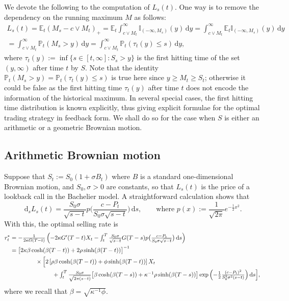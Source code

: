 \documentclass[openany,oneside]{article}
\theoremstyle{definition}
\theoremstyle{remark}
\newtheorem{rem}[thm]{Remark}
\newcommand{\E}{\mathbb{E}} %
\renewcommand{\P}{\mathbb{P}} %
\newcommand{\I}{\mathbb{I}} %
\newcommand{\ts}{\textstyle}
\newcommand{\de}{\,\mathrm{d}}
\begin{document}

We devote the following to the computation of $L_s(t)$. One way is to remove the dependency on the running maximum $M$ as follows:
\begin{multline*}
\ts L_s(t) = \E_t(M_s-c\vee M_t)_+ = \E_t \int_{c\vee M_t}^{\infty}\I_{(-\infty,M_s)}(y) \de y = \int_{c\vee M_t}^\infty \E_t \I_{(-\infty,M_s)}(y)\de y \\
 \ts = \int_{c\vee M_t}^\infty \P_t(M_s > y) \de y= \int_{c\vee M_t}^\infty \P_t(\tau_t(y) \le s) \de y,
\end{multline*}
where $\tau_t(y):=\inf\{s\in[t,\infty] : S_s> y\}$ is the first hitting time of the set $(y,\infty)$ after time $t$ by $S$. Note that the identity $\P_t(M_s > y) = \P_t(\tau_t(y)\le s)$ is true here since $y\ge M_t\ge S_t$; otherwise it could be false as the first hitting time $\tau_t(y)$ after time $t$ does not encode the information of the historical maximum. In several special cases, the first hitting time distribution is known explicitly, thus giving explicit formulae for the optimal trading strategy in feedback form. We shall do so for the case when $S$ is either an arithmetic or a geometric Brownian motion.

\subsection{Arithmetic Brownian motion}
Suppose that $S_t:=S_0(1+ \sigma B_t)$ where $B$ is a standard one-dimensional Brownian motion, and $S_0, \sigma>0$ are constants, so that $L_s(t)$ is the price of a lookback call in the Bachelier model. A straightforward calculation shows that
\[
 \ts \de_s L_s(t) = \frac{S_0\sigma}{\sqrt{s-t}}p\bigl(\frac{c-P_t}{S_0\sigma\sqrt{s-t}}\bigr)\de s,\qquad\text{where } p(x):=\frac{1}{\sqrt{2\pi}}e^{-\frac{1}{2}x^2}.
\]
With this, the optimal selling rate is
\begin{align*}
r^\ast_t &\ts= -\frac{1}{2\kappa G(T-t)}\left(-2\kappa G'(T-t) X_t - \int_t^T \frac{S_0\sigma}{\sqrt{s-t}} G(T-s) p\bigl(\frac{c-P_t}{S_0\sigma\sqrt{s-t}}\bigr) \de s\right) \\
&= \bigl[2\kappa\beta\cosh(\beta (T-t))+2\rho\sinh(\beta (T-t))\bigr]^{-1} \\
&\hspace{1.5cm} \times \Bigl[2\left[\rho\beta\cosh(\beta (T-t))+\phi\sinh(\beta (T-t))\right] X_t\\
&\ts\hspace{2.5cm} + \int_t^T \frac{S_0\sigma}{\sqrt{2\pi(s-t)}}\bigl[\beta\cosh(\beta (T-s))+\kappa^{-1}\rho\sinh(\beta (T-s))\bigr] \exp{\left(-\frac{1}{2}\frac{(c-P_t)^2}{S_0^2\sigma^2(s-t)}\right)} \de s \Bigr],
\end{align*}
where we recall that $\beta=\sqrt{\kappa^{-1}\phi}$.
\end{document}
